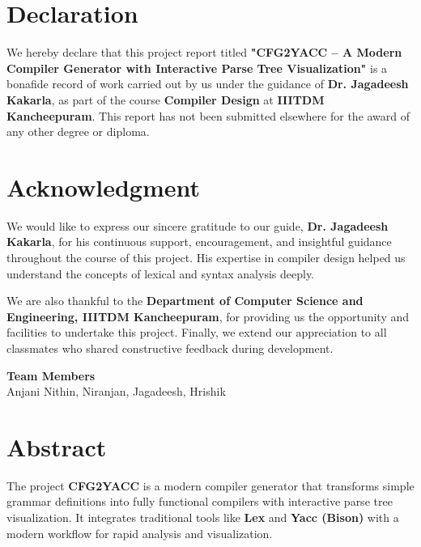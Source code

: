 \documentclass[a4paper,12pt]{report}
\begin{document}
\chapter*{Declaration}
\thispagestyle{contentpages}
We hereby declare that this project report titled \textbf{"CFG2YACC – A Modern Compiler Generator with Interactive Parse Tree Visualization"} is a bonafide record of work carried out by us under the guidance of \textbf{Dr. Jagadeesh Kakarla}, as part of the course \textbf{Compiler Design} at \textbf{IIITDM Kancheepuram}.  
This report has not been submitted elsewhere for the award of any other degree or diploma.

\vspace{2cm}
\begingroup
\let\clearpage\relax

\chapter*{Acknowledgment}
\thispagestyle{contentpages}
We would like to express our sincere gratitude to our guide, \textbf{Dr. Jagadeesh Kakarla}, for his continuous support, encouragement, and insightful guidance throughout the course of this project.  
His expertise in compiler design helped us understand the concepts of lexical and syntax analysis deeply.  

We are also thankful to the \textbf{Department of Computer Science and Engineering, IIITDM Kancheepuram}, for providing us the opportunity and facilities to undertake this project.  
Finally, we extend our appreciation to all classmates who shared constructive feedback during development.

\vspace{1cm}
\begin{flushright}
\textbf{Team Members}\\
Anjani Nithin, Niranjan, Jagadeesh, Hrishik
\end{flushright}

\newpage

\chapter*{Abstract}
\thispagestyle{contentpages}
\justifying
\noindent
The project \textbf{CFG2YACC} is a modern compiler generator that transforms simple grammar definitions into fully functional compilers with interactive parse tree visualization. It integrates traditional tools like \textbf{Lex} and \textbf{Yacc (Bison)} with a modern workflow for rapid analysis and visualization.
\end{document}
